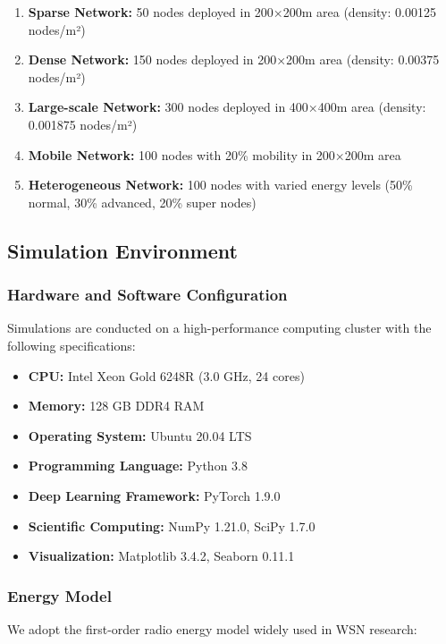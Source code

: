 \documentclass[conference]{IEEEtran}
\begin{document}
\begin{enumerate}
    \item \textbf{Sparse Network:} 50 nodes deployed in 200×200m area (density: 0.00125 nodes/m²)
    \item \textbf{Dense Network:} 150 nodes deployed in 200×200m area (density: 0.00375 nodes/m²)
    \item \textbf{Large-scale Network:} 300 nodes deployed in 400×400m area (density: 0.001875 nodes/m²)
    \item \textbf{Mobile Network:} 100 nodes with 20\% mobility in 200×200m area
    \item \textbf{Heterogeneous Network:} 100 nodes with varied energy levels (50\% normal, 30\% advanced, 20\% super nodes)
\end{enumerate}

\subsection{Simulation Environment}

\subsubsection{Hardware and Software Configuration}

Simulations are conducted on a high-performance computing cluster with the following specifications:

\begin{itemize}
    \item \textbf{CPU:} Intel Xeon Gold 6248R (3.0 GHz, 24 cores)
    \item \textbf{Memory:} 128 GB DDR4 RAM
    \item \textbf{Operating System:} Ubuntu 20.04 LTS
    \item \textbf{Programming Language:} Python 3.8
    \item \textbf{Deep Learning Framework:} PyTorch 1.9.0
    \item \textbf{Scientific Computing:} NumPy 1.21.0, SciPy 1.7.0
    \item \textbf{Visualization:} Matplotlib 3.4.2, Seaborn 0.11.1
\end{itemize}

\subsubsection{Energy Model}

We adopt the first-order radio energy model \cite{heinzelman2000energy} widely used in WSN research:
\end{document}
